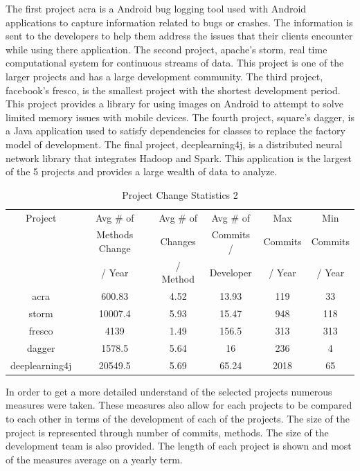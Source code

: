 The first project acra is a Android bug logging tool used with Android applications to capture information related to bugs or crashes. The information is sent to the developers to help them address the issues that their clients encounter while using there application. The second project, apache's storm, real time computational system for continuous streams of data. This project is one of the larger projects and has a large development community. The third project, facebook's fresco, is the smallest project with the shortest development period. This project provides a library for using images on Android to attempt to solve limited memory issues with mobile devices. The fourth project, square's dagger, is a Java application used to satisfy dependencies for classes to replace the factory model of development. The final project, deeplearning4j, is a distributed neural network library that integrates Hadoop and Spark. This application is the largest of the 5 projects and provides a large wealth of data to analyze.

\begin{table}
\begin{center}
    \begin{tabular}{|c|c|c|c|c|c|}
        \hline
        Project & Avg \# of & Avg \# of & Avg \# of & Max & Min \\
         & Methods Change & Changes & Commits / & Commits & Commits \\
         & / Year & / Method & Developer & / Year & / Year \\
        \hline
        acra & 600.83 & 4.52 & 13.93 & 119 & 33 \\
        storm & 10007.4 & 5.93 & 15.47 & 948 & 118 \\
        fresco & 4139 & 1.49 & 156.5 & 313 & 313 \\
        dagger & 1578.5 & 5.64 & 16 & 236 & 4 \\
        deeplearning4j & 20549.5 & 5.69 & 65.24 & 2018 & 65 \\
        \hline
    \end{tabular}
\end{center}
\caption{Project Change Statistics 2}
\label{tab:project_stats_2}
\end{table}

In order to get a more detailed understand of the selected projects numerous measures were taken. These measures also allow for each projects to be compared to each other in terms of the development of each of the projects. The size of the project is represented through number of commits, methods. The size of the development team is also provided. The length of each project is shown and most of the measures average on a yearly term.

